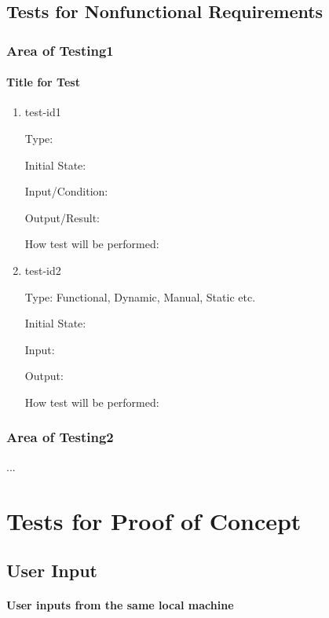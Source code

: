 \documentclass[12pt, titlepage]{article}
\begin{document}
\subsection{Tests for Nonfunctional Requirements}

\subsubsection{Area of Testing1}
		
\paragraph{Title for Test}

\begin{enumerate}

\item{test-id1\\}

Type: 
					
Initial State: 
					
Input/Condition: 
					
Output/Result: 
					
How test will be performed: 
					
\item{test-id2\\}

Type: Functional, Dynamic, Manual, Static etc.
					
Initial State: 
					
Input: 
					
Output: 
					
How test will be performed: 

\end{enumerate}

\subsubsection{Area of Testing2}

...

\section{Tests for Proof of Concept}

\subsection{User Input}
		
\paragraph{User inputs from the same local machine}
\end{document}
